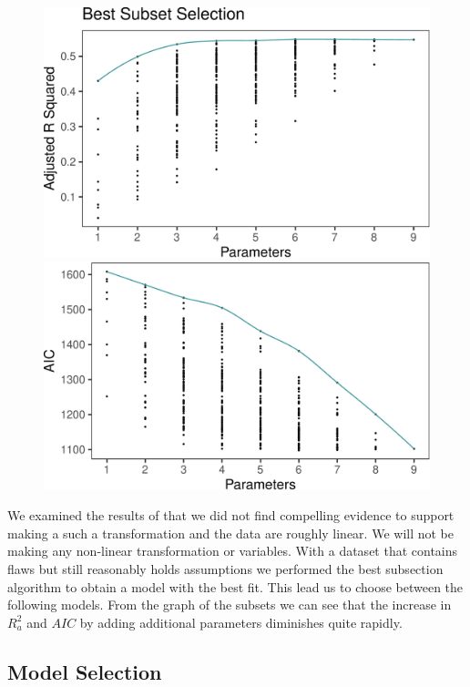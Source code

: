 \documentclass[
  english,
  man,floatsintext]{apa6}
\begin{document}
\begin{figure}
\includegraphics[width=0.5\linewidth]{paper_files/figure-latex/unnamed-chunk-3-1} \includegraphics[width=0.5\linewidth]{paper_files/figure-latex/unnamed-chunk-3-2} \caption{ }\label{fig:unnamed-chunk-3}
\end{figure}

We examined the results of that we did not find compelling evidence to support making a such a transformation and the data are roughly linear. We will not be making any non-linear transformation or variables. With a dataset that contains flaws but still reasonably holds assumptions we performed the best subsection algorithm to obtain a model with the best fit. This lead us to choose between the following models. From the graph of the subsets we can see that the increase in \(R^{2}_a\) and \(AIC\) by adding additional parameters diminishes quite rapidly.

\hypertarget{model-selection}{%
\subsection{Model Selection}\label{model-selection}}
\end{document}
